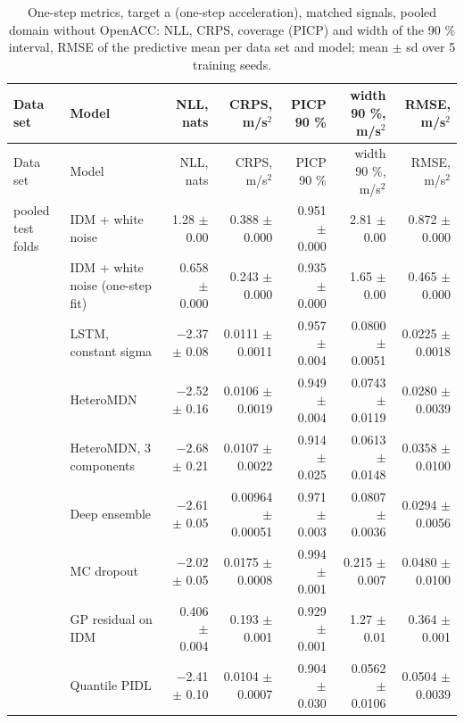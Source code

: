 \begingroup
\footnotesize
\begin{longtable}{llrrrrr}
\caption{One-step metrics, target a (one-step acceleration), matched signals, pooled domain without OpenACC: NLL, CRPS, coverage (PICP) and width of the 90 \% interval, RMSE of the predictive mean per data set and model; mean $\pm$ sd over 5 training seeds.}\label{tab:t1-one-step--lodo-openacc--a} \\
\toprule
Data set & Model & NLL, nats & CRPS, m/s$^2$ & PICP 90 \% & width 90 \%, m/s$^2$ & RMSE, m/s$^2$ \\
\midrule
\endfirsthead
\toprule
Data set & Model & NLL, nats & CRPS, m/s$^2$ & PICP 90 \% & width 90 \%, m/s$^2$ & RMSE, m/s$^2$ \\
\midrule
\endhead
\bottomrule
\endlastfoot
pooled test folds & IDM + white noise & 1.28 $\pm$ 0.00 & 0.388 $\pm$ 0.000 & 0.951 $\pm$ 0.000 & 2.81 $\pm$ 0.00 & 0.872 $\pm$ 0.000 \\
 & IDM + white noise (one-step fit) & 0.658 $\pm$ 0.000 & 0.243 $\pm$ 0.000 & 0.935 $\pm$ 0.000 & 1.65 $\pm$ 0.00 & 0.465 $\pm$ 0.000 \\
 & LSTM, constant sigma & $-$2.37 $\pm$ 0.08 & 0.0111 $\pm$ 0.0011 & 0.957 $\pm$ 0.004 & 0.0800 $\pm$ 0.0051 & 0.0225 $\pm$ 0.0018 \\
 & HeteroMDN & $-$2.52 $\pm$ 0.16 & 0.0106 $\pm$ 0.0019 & 0.949 $\pm$ 0.004 & 0.0743 $\pm$ 0.0119 & 0.0280 $\pm$ 0.0039 \\
 & HeteroMDN, 3 components & $-$2.68 $\pm$ 0.21 & 0.0107 $\pm$ 0.0022 & 0.914 $\pm$ 0.025 & 0.0613 $\pm$ 0.0148 & 0.0358 $\pm$ 0.0100 \\
 & Deep ensemble & $-$2.61 $\pm$ 0.05 & 0.00964 $\pm$ 0.00051 & 0.971 $\pm$ 0.003 & 0.0807 $\pm$ 0.0036 & 0.0294 $\pm$ 0.0056 \\
 & MC dropout & $-$2.02 $\pm$ 0.05 & 0.0175 $\pm$ 0.0008 & 0.994 $\pm$ 0.001 & 0.215 $\pm$ 0.007 & 0.0480 $\pm$ 0.0100 \\
 & GP residual on IDM & 0.406 $\pm$ 0.004 & 0.193 $\pm$ 0.001 & 0.929 $\pm$ 0.001 & 1.27 $\pm$ 0.01 & 0.364 $\pm$ 0.001 \\
 & Quantile PIDL & $-$2.41 $\pm$ 0.10 & 0.0104 $\pm$ 0.0007 & 0.904 $\pm$ 0.030 & 0.0562 $\pm$ 0.0106 & 0.0504 $\pm$ 0.0039 \\

\end{longtable}
